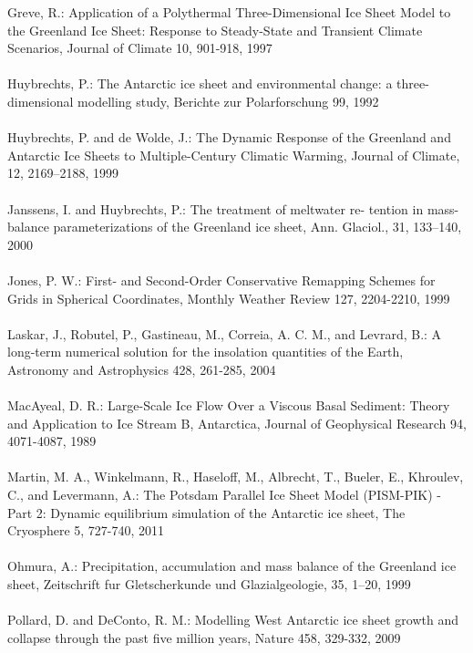\documentclass{article}
\begin{document}
Greve, R.: Application of a Polythermal Three-Dimensional Ice Sheet Model to the Greenland Ice Sheet: Response to Steady-State and Transient Climate Scenarios, Journal of Climate 10, 901-918, 1997\\
\\
Huybrechts, P.: The Antarctic ice sheet and environmental change: a three-dimensional modelling study, Berichte zur Polarforschung 99, 1992\\
\\
Huybrechts, P. and de Wolde, J.: The Dynamic Response of the Greenland and Antarctic Ice Sheets to Multiple-Century Climatic Warming, Journal of Climate, 12, 2169–2188, 1999\\
\\
Janssens, I. and Huybrechts, P.: The treatment of meltwater re- tention in mass-balance parameterizations of the Greenland ice sheet, Ann. Glaciol., 31, 133–140, 2000\\
\\
Jones, P. W.: First- and Second-Order Conservative Remapping Schemes for Grids in Spherical Coordinates, Monthly Weather Review 127, 2204-2210, 1999\\
\\
Laskar, J., Robutel, P., Gastineau, M., Correia, A. C. M., and Levrard, B.: A long-term numerical solution for the insolation quantities of the Earth, Astronomy and Astrophysics 428, 261-285, 2004\\
\\
MacAyeal, D. R.: Large-Scale Ice Flow Over a Viscous Basal Sediment: Theory and Application to Ice Stream B, Antarctica, Journal of Geophysical Research 94, 4071-4087, 1989\\
\\
Martin, M. A., Winkelmann, R., Haseloff, M., Albrecht, T., Bueler, E., Khroulev, C., and Levermann, A.: The Potsdam Parallel Ice Sheet Model (PISM-PIK) - Part 2: Dynamic equilibrium simulation of the Antarctic ice sheet, The Cryosphere 5, 727-740, 2011\\
\\
Ohmura, A.: Precipitation, accumulation and mass balance of the Greenland ice sheet, Zeitschrift fur Gletscherkunde und Glazialgeologie, 35, 1–20, 1999\\
\\
Pollard, D. and DeConto, R. M.: Modelling West Antarctic ice sheet growth and collapse through the past five million years, Nature 458, 329-332, 2009\\
\\
\end{document}
